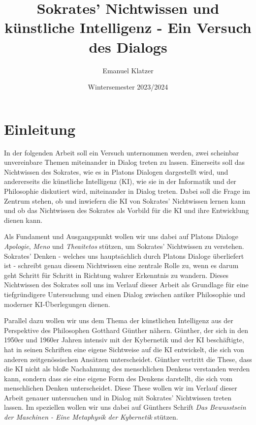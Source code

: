 \documentclass[12pt]{article}
\begin{document}
\pagestyle{fancy}

\title{Sokrates' Nichtwissen und künstliche Intelligenz - Ein Versuch des Dialogs}
\author{Emanuel Klatzer}
\date{Wintersemester 2023/2024}
\maketitle %
\thispagestyle{fancy} %


\section{Einleitung}
In der folgenden Arbeit soll ein Versuch unternommen werden, zwei scheinbar unvereinbare Themen
miteinander in Dialog treten zu lassen. Einerseits soll das Nichtwissen des Sokrates, wie es in
Platons Dialogen dargestellt wird, und andererseits die künstliche Intelligenz (KI), wie sie in
der Informatik und der Philosophie diskutiert wird, miteinander in Dialog treten. Dabei soll die 
Frage im Zentrum stehen, ob und inwiefern die KI von Sokrates' Nichtwissen lernen kann und ob das
Nichtwissen des Sokrates als Vorbild für die KI und ihre Entwicklung dienen kann.

Als Fundament und Ausgangspunkt wollen wir uns dabei auf Platons Dialoge \textit{Apologie},
\textit{Meno} und \textit{Theaitetos} stützen, um Sokrates' Nichtwissen zu verstehen. Sokrates'
Denken - welches uns hauptsächlich durch Platons Dialoge überliefert ist - schreibt genau
diesem Nichtwissen eine zentrale Rolle zu, wenn es darum geht Schritt für Schritt in Richtung
wahrer Erkenntnis zu wandern. Dieses Nichtwissen des Sokrates soll uns im Verlauf dieser Arbeit als
Grundlage für eine tiefgründigere Untersuchung und einen Dialog zwischen antiker Philosophie und
moderner KI-Überlegungen dienen.

Parallel dazu wollen wir uns dem Thema der künstlichen Intelligenz aus der Perspektive des Philosophen
Gotthard Günther nähern. Günther, der sich in den 1950er und 1960er Jahren intensiv mit der Kybernetik
und der KI beschäftigte, hat in seinen Schriften eine eigene Sichtweise auf die KI entwickelt, die
sich von anderen zeitgenössischen Ansätzen unterscheidet. Günther vertritt die These, dass die KI
nicht als bloße Nachahmung des menschlichen Denkens verstanden werden kann, sondern dass sie eine
eigene Form des Denkens darstellt, die sich vom menschlichen Denken unterscheidet. Diese These
wollen wir im Verlauf dieser Arbeit genauer untersuchen und in Dialog mit Sokrates' Nichtwissen
treten lassen. Im speziellen wollen wir uns dabei auf Günthers Schrift \textit{Das Bewusstsein der 
Maschinen - Eine Metaphysik der Kybernetik} stützen.
\end{document}
